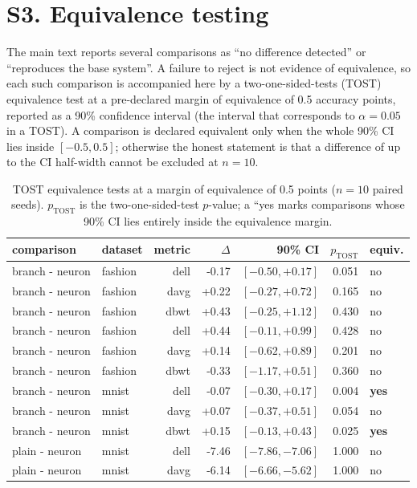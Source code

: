 \documentclass[10pt]{article}
\begin{document}
\section{S3. Equivalence testing}
\noindent The main text reports several comparisons as ``no difference
detected'' or ``reproduces the base system''. A failure to reject is not
evidence of equivalence, so each such comparison is accompanied here by a
two-one-sided-tests (TOST) equivalence test at a pre-declared margin of
equivalence of 0.5 accuracy points, reported as a 90\% confidence
interval (the interval that corresponds to $\alpha=0.05$ in a TOST). A
comparison is declared equivalent only when the whole 90\% CI lies inside
$[-0.5,0.5]$; otherwise the honest statement is that a difference of
up to the CI half-width cannot be excluded at $n=10$.

\begin{table}[h]
\centering\small
\caption{TOST equivalence tests at a margin of equivalence of 0.5 points ($n=10$ paired seeds). $p_{\mathrm{TOST}}$ is the two-one-sided-test $p$-value; a ``yes marks comparisons whose 90\% CI lies entirely inside the equivalence margin.}
\label{tab:sup-tost}
\begin{tabular}{llrrrrl}
\toprule
comparison & dataset & metric & $\Delta$ & 90\% CI & $p_{\mathrm{TOST}}$ & equiv. \\
\midrule
branch - neuron & fashion & dell & -0.17 & $[-0.50, +0.17]$ & 0.051 & no \\
branch - neuron & fashion & davg & +0.22 & $[-0.27, +0.72]$ & 0.165 & no \\
branch - neuron & fashion & dbwt & +0.43 & $[-0.25, +1.12]$ & 0.430 & no \\
branch - neuron & fashion & dell & +0.44 & $[-0.11, +0.99]$ & 0.428 & no \\
branch - neuron & fashion & davg & +0.14 & $[-0.62, +0.89]$ & 0.201 & no \\
branch - neuron & fashion & dbwt & -0.33 & $[-1.17, +0.51]$ & 0.360 & no \\
branch - neuron & mnist & dell & -0.07 & $[-0.30, +0.17]$ & 0.004 & \textbf{yes} \\
branch - neuron & mnist & davg & +0.07 & $[-0.37, +0.51]$ & 0.054 & no \\
branch - neuron & mnist & dbwt & +0.15 & $[-0.13, +0.43]$ & 0.025 & \textbf{yes} \\
plain - neuron & mnist & dell & -7.46 & $[-7.86, -7.06]$ & 1.000 & no \\
plain - neuron & mnist & davg & -6.14 & $[-6.66, -5.62]$ & 1.000 & no \\

\end{tabular}
\end{table}
\end{document}
